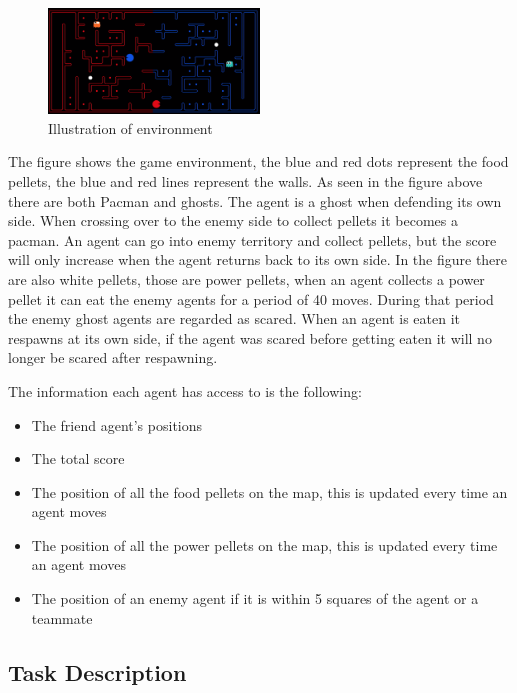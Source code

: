 \documentclass[a4paper,12pt]{article}
\begin{document}
\begin{figure}[!htbp]
  \centering
  \includegraphics[width=0.5\textwidth]{./figuresA4/pacman_illustration.png}
  \caption{Illustration of environment}
  \label{fig:drag_force}
\end{figure}

The figure shows the game environment, the blue and red dots represent the food pellets, the blue and red lines represent the walls. 
As seen in the figure above there are both Pacman and ghosts. The agent is a ghost when defending its own side. When crossing over to the enemy side to collect pellets it becomes a pacman.
An agent can go into enemy territory and collect pellets, but the score will only increase when the agent returns back to its own side. In the figure there are also white pellets, 
those are power pellets, when an agent collects a power pellet it can eat the enemy agents for a period of 40 moves. During that period the enemy ghost agents are regarded as scared.
When an agent is eaten it respawns at its own side, if the agent was scared before getting eaten it will no longer be scared after respawning.

The information each agent has access to is the following:
\begin{itemize}
  \item The friend agent's positions
  \item The total score
  \item The position of all the food pellets on the map, this is updated every time an agent moves
  \item The position of all the power pellets on the map, this is updated every time an agent moves
  \item The position of an enemy agent if it is within 5 squares of the agent or a teammate
\end{itemize}






\subsection{Task Description}
\end{document}
